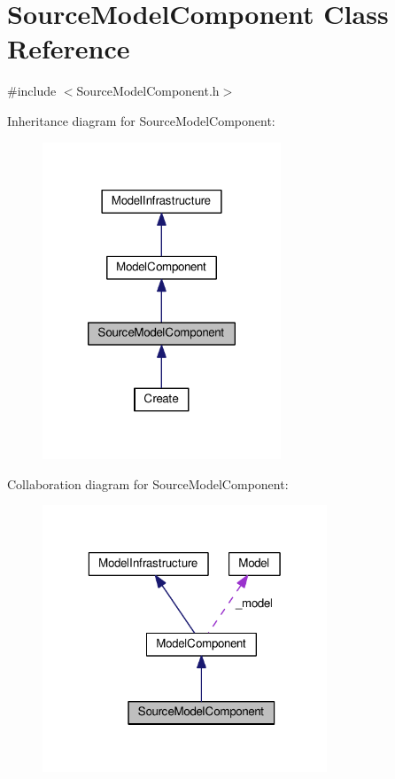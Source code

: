 \hypertarget{class_source_model_component}{\section{Source\-Model\-Component Class Reference}
\label{class_source_model_component}
}


{\ttfamily \#include $<$Source\-Model\-Component.\-h$>$}



Inheritance diagram for Source\-Model\-Component\-:
\nopagebreak
\begin{figure}[H]
\begin{center}
\leavevmode
\includegraphics[width=202pt]{class_source_model_component__inherit__graph}
\end{center}
\end{figure}


Collaboration diagram for Source\-Model\-Component\-:
\nopagebreak
\begin{figure}[H]
\begin{center}
\leavevmode
\includegraphics[width=241pt]{class_source_model_component__coll__graph}
\end{center}
\end{figure}
